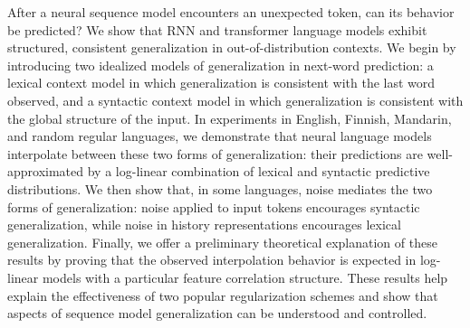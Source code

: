 After a neural sequence model encounters an unexpected token, can its behavior be predicted? We show that RNN and transformer language models exhibit structured, consistent generalization in out-of-distribution contexts. We begin by introducing two idealized models of generalization in next-word prediction: a lexical context model in which generalization is consistent with the last word observed, and a syntactic context model in which generalization is consistent with the global structure of the input. In experiments in English, Finnish, Mandarin, and random regular languages, we demonstrate that neural language models interpolate between these two forms of generalization: their predictions are well-approximated by a log-linear combination of lexical and syntactic predictive distributions. We then show that, in some languages, noise mediates the two forms of generalization: noise applied to input tokens encourages syntactic generalization, while noise in history representations encourages lexical generalization. Finally, we offer a preliminary theoretical explanation of these results by proving that the observed interpolation behavior is expected in log-linear models with a particular feature correlation structure. These results help explain the effectiveness of two popular regularization schemes and show that aspects of sequence model generalization can be understood and controlled.

